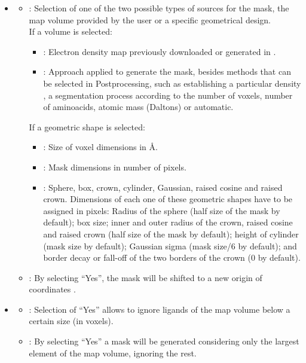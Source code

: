 \begin{itemize}
    \begin{itemize}
     \item {}
     \begin{itemize}
      \item {}: Selection of one of the two possible types of sources for the mask, the map volume provided by the user or a specific geometrical design.\\If a volume is selected:
        \begin{itemize}
        \item {}: Electron density map previously downloaded or generated in \scipion.
        \item {}: Approach applied to generate the mask, besides methods that can be selected in Postprocessing, such as establishing a particular density , a segmentation process according to the number of voxels, number of aminoacids, atomic mass (Daltons) or automatic.
        \end{itemize}
      If a geometric shape is selected:
        \begin{itemize}
        \item {}: Size of voxel dimensions in \AA.
        \item {}: Mask dimensions in number of pixels.
        \item {}: Sphere, box, crown, cylinder, Gaussian, raised cosine and raised crown. Dimensions of each one of these geometric shapes have to be assigned in pixels: Radius of the sphere (half size of the mask by default); box size; inner and outer radius of the crown, raised cosine and raised crown (half size of the mask by default); height of cylinder (mask size by default); Gaussian sigma (mask size/6 by default); and border decay or fall-off of the two borders of the crown (0 by default).
        \end{itemize}  
      \item {}: By selecting ``Yes'', the mask will be shifted to a new origin of coordinates .
     \end{itemize} 
     \item {}
     \begin{itemize}
     \item {}: Selection of ``Yes'' allows to ignore ligands of the map volume below a certain size (in voxels).
     \item {}: By selecting ``Yes'' a mask will be generated considering only the largest element of the map volume, ignoring the rest.

\end{itemize}
\end{itemize}
\end{itemize}
